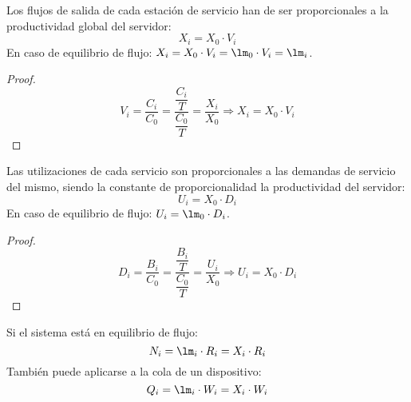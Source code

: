 \begin{prop}
    Los flujos de salida de cada estación de servicio han de ser proporcionales a la productividad global del servidor:
    \begin{equation*}
        X_i = X_0\cdot V_i
    \end{equation*}
    En caso de equilibrio de flujo: $X_i = X_0 \cdot V_i = \lm_0\cdot V_i = \lm_i$.
    \begin{proof}
        \begin{equation*}
            V_i = \dfrac{C_i}{C_0} = \dfrac{\dfrac{C_i}{T}}{\dfrac{C_0}{T}} = \dfrac{X_i}{X_0} \Longrightarrow X_i = X_0\cdot V_i
        \end{equation*}
    \end{proof}
\end{prop}

\begin{prop}
    Las utilizaciones de cada servicio son proporcionales a las demandas de servicio del mismo, siendo la constante de proporcionalidad la productividad del servidor:
    \begin{equation*}
        U_i = X_0 \cdot D_i
    \end{equation*}
    En caso de equilibrio de flujo: $U_i = \lm_0 \cdot D_i$.
    \begin{proof}
        \begin{equation*}
            D_i = \dfrac{B_i}{C_0} = \dfrac{\dfrac{B_i}{T}}{\dfrac{C_0}{T}} = \dfrac{U_i}{X_0} \Longrightarrow U_i = X_0\cdot D_i
        \end{equation*}
    \end{proof}
\end{prop}

\begin{prop}
    Si el sistema está en equilibrio de flujo:
    \begin{equation*}
        N_i = \lm_i \cdot R_i = X_i\cdot R_i
    \end{equation*}
    También puede aplicarse a la cola de un dispositivo:
    \begin{equation*}
        Q_i = \lm_i \cdot W_i = X_i\cdot W_i
    \end{equation*}
\end{prop}

